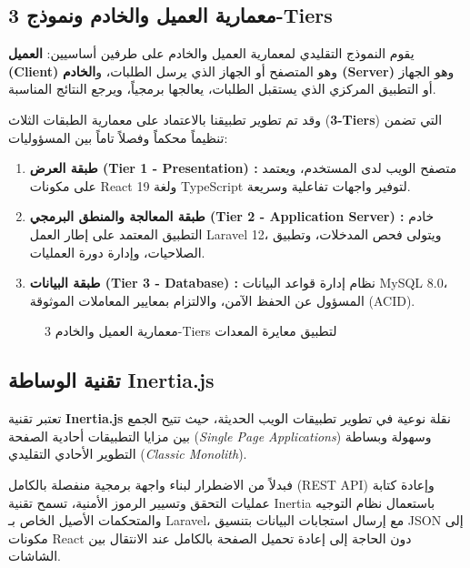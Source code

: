 \documentclass{bts-report-ar}
\begin{document}
\subsection{معمارية العميل والخادم ونموذج 3-Tiers}
يقوم النموذج التقليدي لمعمارية العميل والخادم على طرفين أساسيين: \textbf{العميل (Client)} وهو المتصفح أو الجهاز الذي يرسل الطلبات، و\textbf{الخادم (Server)} وهو الجهاز أو التطبيق المركزي الذي يستقبل الطلبات، يعالجها برمجياً، ويرجع النتائج المناسبة.

وقد تم تطوير تطبيقنا بالاعتماد على معمارية الطبقات الثلاث (\textbf{3-Tiers}) التي تضمن تنظيماً محكماً وفصلاً تاماً بين المسؤوليات:
\begin{enumerate}
  \item \textbf{طبقة العرض (Tier 1 - Presentation) :} متصفح الويب لدى المستخدم، ويعتمد على مكونات React 19 ولغة TypeScript لتوفير واجهات تفاعلية وسريعة.
  \item \textbf{طبقة المعالجة والمنطق البرمجي (Tier 2 - Application Server) :} خادم التطبيق المعتمد على إطار العمل Laravel 12، ويتولى فحص المدخلات، وتطبيق الصلاحيات، وإدارة دورة العمليات.
  \item \textbf{طبقة البيانات (Tier 3 - Database) :} نظام إدارة قواعد البيانات MySQL 8.0، المسؤول عن الحفظ الآمن، والالتزام بمعايير المعاملات الموثوقة (ACID).
\end{enumerate}

\begin{figure}[H]
  \centering
  \begin{LTR}
  \resizebox{\textwidth}{!}{}
  \end{LTR}
  \caption{معمارية العميل والخادم 3-Tiers لتطبيق معايرة المعدات}
  \label{fig:web-arch}
\end{figure}

\subsection{تقنية الوساطة Inertia.js}
تعتبر تقنية \textbf{Inertia.js} نقلة نوعية في تطوير تطبيقات الويب الحديثة، حيث تتيح الجمع بين مزايا التطبيقات أحادية الصفحة (\textit{Single Page Applications}) وسهولة وبساطة التطوير الأحادي التقليدي (\textit{Classic Monolith}).

فبدلاً من الاضطرار لبناء واجهة برمجية منفصلة بالكامل (REST API) وإعادة كتابة عمليات التحقق وتسيير الرموز الأمنية، تسمح تقنية Inertia باستعمال نظام التوجيه والمتحكمات الأصيل الخاص بـ Laravel، مع إرسال استجابات البيانات بتنسيق JSON إلى مكونات React دون الحاجة إلى إعادة تحميل الصفحة بالكامل عند الانتقال بين الشاشات.
\end{document}
